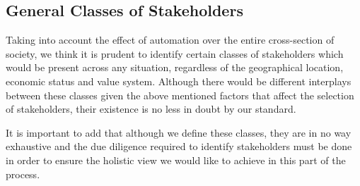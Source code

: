 \subsection{General Classes of Stakeholders}
\label{sec:-general}
Taking into account the effect of automation over the entire cross-section of society, we think it is prudent to identify certain classes of stakeholders which would be present across any situation, regardless of the geographical location, economic status and value system. Although there would be different interplays between these classes given the above mentioned factors that affect the selection of stakeholders, their existence is no less in doubt by our standard.

It is important to add that although we define these classes, they are in no way exhaustive and the due diligence required to identify stakeholders must be done in order to ensure the holistic view we would like to achieve in this part of the process.
